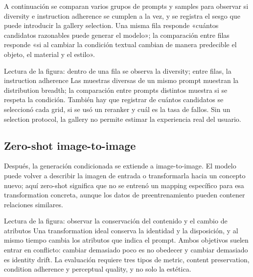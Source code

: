 A continuación se comparan varios grupos de prompts y samples para observar si diversity e instruction adherence se cumplen a la vez, y se registra el sesgo que puede introducir la gallery selection. Una misma fila responde «cuántos candidatos razonables puede generar el modelo»; la comparación entre filas responde «si al cambiar la condición textual cambian de manera predecible el objeto, el material y el estilo».


\begin{knowledgebox}{Lectura de la figura: dentro de una fila se observa la diversity; entre filas, la instruction adherence}
Las muestras diversas de un mismo prompt muestran la distribution breadth; la comparación entre prompts distintos muestra si se respeta la condición. También hay que registrar de cuántos candidatos se seleccionó cada grid, si se usó un reranker y cuál es la tasa de fallos. Sin un selection protocol, la gallery no permite estimar la experiencia real del usuario.
\end{knowledgebox}

\subsection{Zero-shot image-to-image}

Después, la generación condicionada se extiende a image-to-image. El modelo puede volver a describir la imagen de entrada o transformarla hacia un concepto nuevo; aquí zero-shot significa que no se entrenó un mapping específico para esa transformation concreta, aunque los datos de preentrenamiento pueden contener relaciones similares.


\begin{knowledgebox}{Lectura de la figura: observar la conservación del contenido y el cambio de atributos}
Una transformation ideal conserva la identidad y la disposición, y al mismo tiempo cambia los atributos que indica el prompt. Ambos objetivos suelen entrar en conflicto: cambiar demasiado poco es no obedecer y cambiar demasiado es identity drift. La evaluación requiere tres tipos de metric, content preservation, condition adherence y perceptual quality, y no solo la estética.
\end{knowledgebox}

